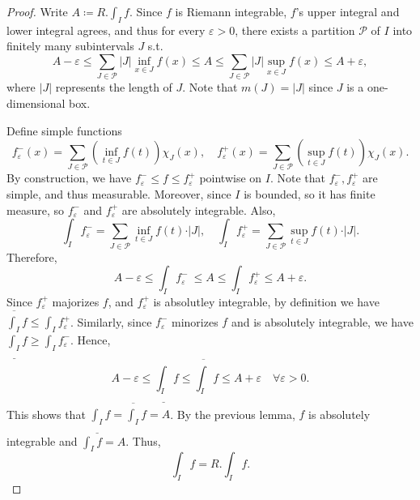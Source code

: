 \begin{proof}
    Write \(A \coloneqq R. \int _I f\). Since \(f\) is Riemann integrable, \(f\)'s upper integral and lower integral agrees, and thus for every \(\varepsilon > 0\), there exists a partition \(\mathcal{P}\) of \(I\) into finitely many subintervals \(J\) s.t. 
    \[
        A - \varepsilon \le \sum_{J \in \mathcal{P}} \vert J \vert \inf _{x \in J} f(x) \le A \le \sum_{J \in \mathcal{P}} \vert J \vert \sup _{x \in J} f(x) \le A + \varepsilon,
    \]      
    where \(\vert J \vert \) represents the length of \(J\). Note that \(m(J) = \vert J \vert \) since \(J\) is a one-dimensional box. 
    
    Define simple functions
    \[
        f_{\varepsilon}^-(x) = \sum_{J \in \mathcal{P}} \left( \inf _{t \in J} f(t) \right) \chi _J(x), \quad f_{\varepsilon}^+(x) = \sum_{J \in \mathcal{P}} \left( \sup _{t \in J} f(t) \right) \chi _J(x). 
    \]
    By construction, we have \(f_{\varepsilon}^- \le f \le f_{\varepsilon}^+\) pointwise on \(I\). Note that \(f_{\varepsilon }^-, f_{\varepsilon}^+ \) are simple, and thus measurable. Moreover, since \(I\) is bounded, so it has finite measure, so \(f_{\varepsilon}^-\) and \(f_{\varepsilon}^+\) are absolutely integrable. Also, 
    \[
        \int _I f_{\varepsilon }^- = \sum_{J \in \mathcal{P}} \inf _{t \in J} f(t) \cdot \vert J \vert, \quad \int _I f_{\varepsilon}^+ = \sum_{J \in \mathcal{P}} \sup _{t \in J} f(t) \cdot \vert J \vert.
    \]
    Therefore,
    \[
        A - \varepsilon \le \int _I f_{\varepsilon}^- \         \le A \le \int _I f_{\varepsilon}^+ \le A + \varepsilon.
    \] 
    Since \(f_{\varepsilon }^+ \) majorizes \(f\), and \(f_{\varepsilon}^+ \) is absolutley integrable, by definition we have \(\overline{\int _I} f \le \int _I f_{\varepsilon}^+ \). Similarly, since \(f_{\varepsilon}^- \) minorizes \(f\) and is absolutely integrable, we have \(\underline{\int _I} f \ge \int _I f_{\varepsilon}^- \). Hence,
    \[
        A - \varepsilon \le \underline{\int _I} f \le \overline{\int _I} f \le A + \varepsilon \quad \forall \varepsilon > 0.
    \]     
    This shows that \(\underline{\int _I} f = \overline{\int _I} f = A\). By the previous lemma, \(f\) is absolutely integrable and \(\int _I f = A\). Thus, 
    \[
        \int _I f = R. \int _I f.
    \]
\end{proof}